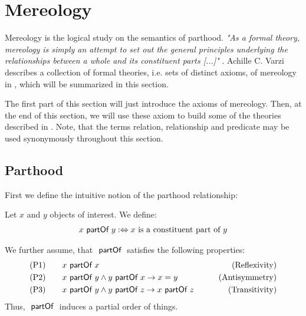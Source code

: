\section{Mereology}
\label{section:Mereology}

Mereology is the logical study on the semantics of parthood.
\textit{"As a formal theory, mereology is simply
an attempt to set out the general principles underlying the relationships between a whole and its constituent parts [...]"} \cite{DBLP:journals/dke/Varzi96}.
Achille C. Varzi describes a collection of formal theories, i.e. sets of distinct axioms, of mereology in \cite{DBLP:journals/dke/Varzi96}, which will be summarized in this section.



The first part of this section will just introduce the axioms of mereology.
Then, at the end of this section, we will use these axiom to build some of the theories described in \cite{DBLP:journals/dke/Varzi96}.
Note, that the terms relation, relationship and predicate may be used synonymously throughout this section.

\subsection{Parthood}
\label{subsection:Parthood}
First we define the intuitive notion of the parthood relationship:
\begin{definition}[$\partOf$]
Let $x$ and $y$ objects of interest.
We define:
\begin{align}
x ~\textsf{partOf}~ y
:\Leftrightarrow
x \text{ is a constituent part of } y
\end{align}
\end{definition}
We further assume, that $\partOf$ satisfies the following properties:
\begin{align}
\label{axiom:P1}
&\text{(P1)}
\qquad x ~\textsf{partOf}~ x 
&\qquad \text{(Reflexivity)}
\\
\label{axiom:P2}
&\text{(P2)}
\qquad x ~\textsf{partOf}~ y \wedge y ~\textsf{partOf}~ x \rightarrow x = y
&\qquad \text{(Antisymmetry)}
\\
\label{axiom:P3}
&\text{(P3)}
\qquad x ~\textsf{partOf}~ y \wedge y ~\textsf{partOf}~ z \rightarrow x ~\textsf{partOf}~ z
&\qquad \text{(Transitivity)}
\end{align}
Thus, $\partOf$ induces a partial order of things.

